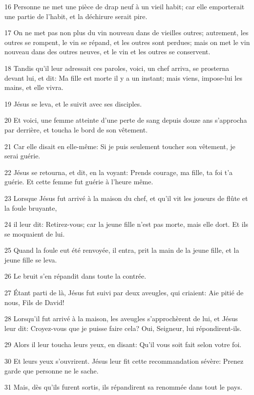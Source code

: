 \par 16 Personne ne met une pièce de drap neuf à un vieil habit; car elle emporterait une partie de l'habit, et la déchirure serait pire.
\par 17 On ne met pas non plus du vin nouveau dans de vieilles outres; autrement, les outres se rompent, le vin se répand, et les outres sont perdues; mais on met le vin nouveau dans des outres neuves, et le vin et les outres se conservent.
\par 18 Tandis qu'il leur adressait ces paroles, voici, un chef arriva, se prosterna devant lui, et dit: Ma fille est morte il y a un instant; mais viens, impose-lui les mains, et elle vivra.
\par 19 Jésus se leva, et le suivit avec ses disciples.
\par 20 Et voici, une femme atteinte d'une perte de sang depuis douze ans s'approcha par derrière, et toucha le bord de son vêtement.
\par 21 Car elle disait en elle-même: Si je puis seulement toucher son vêtement, je serai guérie.
\par 22 Jésus se retourna, et dit, en la voyant: Prends courage, ma fille, ta foi t'a guérie. Et cette femme fut guérie à l'heure même.
\par 23 Lorsque Jésus fut arrivé à la maison du chef, et qu'il vit les joueurs de flûte et la foule bruyante,
\par 24 il leur dit: Retirez-vous; car la jeune fille n'est pas morte, mais elle dort. Et ils se moquaient de lui.
\par 25 Quand la foule eut été renvoyée, il entra, prit la main de la jeune fille, et la jeune fille se leva.
\par 26 Le bruit s'en répandit dans toute la contrée.
\par 27 Étant parti de là, Jésus fut suivi par deux aveugles, qui criaient: Aie pitié de nous, Fils de David!
\par 28 Lorsqu'il fut arrivé à la maison, les aveugles s'approchèrent de lui, et Jésus leur dit: Croyez-vous que je puisse faire cela? Oui, Seigneur, lui répondirent-ils.
\par 29 Alors il leur toucha leurs yeux, en disant: Qu'il vous soit fait selon votre foi.
\par 30 Et leurs yeux s'ouvrirent. Jésus leur fit cette recommandation sévère: Prenez garde que personne ne le sache.
\par 31 Mais, dès qu'ils furent sortis, ils répandirent sa renommée dans tout le pays.
